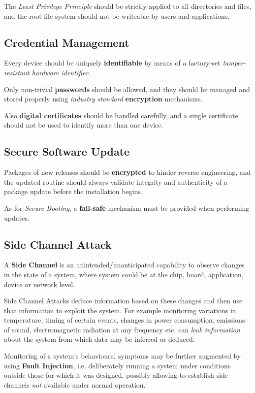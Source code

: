 The \textit{Least Privilege Principle} should be strictly applied to all directories and files, and the root file system should not be writeable by users and applications.

\subsection{Credential Management}
Every device should be uniquely \textbf{identifiable} by means of a factory-set \textit{tamper-resistant hardware identifier}.

Only non-trivial \textbf{passwords} should be allowed, and they should be managed and stored properly using \textit{industry standard} \textbf{encryption} mechanisms.

Also \textbf{digital certificates} should be handled carefully, and a single certificate should not be used to identify more than one device.

\subsection{Secure Software Update}
Packages of new releases should be \textbf{encrypted} to hinder reverse engineering, and the
updated routine should always validate integrity and authenticity of a package update before the installation begins.

As for \textit{Secure Booting}, a \textbf{fail-safe} mechanism must be provided when performing updates.

\subsection{Side Channel Attack}
A \textbf{Side Channel} is an unintended/unanticipated capability to observe changes in the state
of a system, where system could be at the chip, board, application, device or network
level.

Side Channel Attacks deduce information based on these changes and then use that
information to exploit the system. 
For example monitoring variations in temperature,
timing of certain events, changes in power consumption, emissions of sound,
electromagnetic radiation at any frequency etc. can \textit{leak information} about the system
from which data may be inferred or deduced.

Monitoring of a system’s behavioural symptoms may be further augmented by using \textbf{Fault
Injection}, i.e. deliberately running a system under conditions outside those for which it was
designed, possibly allowing to establish side channels \textit{not} available under normal operation.
